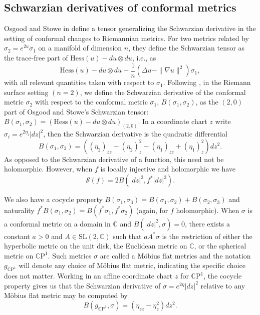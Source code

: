 \documentclass{amsart}
\newcommand{\C}{\mathbb{C}}
\newcommand{\CP}{\mathbb{C}\mathrm{P}}
\begin{document}
\subsection{Schwarzian derivatives of conformal metrics}



Osgood and Stowe in \cite{osgood-stowe1992} define a tensor generalizing the Schwarzian derivative in the setting of conformal changes to Riemannian metrics. 
For two metrics related by $\sigma_2 = e^{2u} \sigma_1$ on a manifold of dimension $n$, they define the Schwarzian tensor as the trace-free part of $\mathrm{Hess}(u) - du \otimes du$, i.e., as
\[
\mathrm{Hess}(u) - du \otimes du - \frac{1}{n}\left( \Delta u - \| \nabla u \|^2\right)\sigma_1,
\]
with all relevant quantities taken with respect to $\sigma_1$. 
Following \cite{dumas2017}, in the Riemann surface setting $(n=2)$, we define the Schwarzian derivative of the conformal metric $\sigma_2$ with respect to the conformal metric $\sigma_1$, $B(\sigma_1,\sigma_2)$, as the $(2,0)$ part of Osgood and Stowe's Schwarzian tensor: $B(\sigma_1,\sigma_2) = \left(\mathrm{Hess}(u) - du \otimes du\right)_{(2,0)}$. 
In a coordinate chart $z$  write $\sigma_i = e^{2\eta_i} |dz|^2$, then the Schwarzian derivative is the quadratic differential 
 \[
 B(\sigma_1,\sigma_2) = \left( (\eta_2)_{zz} - (\eta_2)_z^2 - (\eta_1)_{zz} + (\eta_1)_z^2 \right) dz^2.
 \]
As opposed to the Schwarzian derivative of a function, this need not be holomorphic. 
However, when $f$ is locally injective and holomorphic we have
 \[
 \mathcal{S}(f) = 2B(|dz|^2,f^*|dz|^2).
 \]
 
 
We also have a cocycle property $B(\sigma_1,\sigma_3) = B(\sigma_1,\sigma_2) + B(\sigma_2,\sigma_3)$ and naturality $f^*B(\sigma_1,\sigma_2) = B(f^*\sigma_1,f^*\sigma_2)$ (again, for $f$ holomorphic). 
When $\sigma$ is a conformal metric on a domain in $\C$ and $B(|dz|^2,\sigma) = 0$, there exists a constant $a > 0$ and $A \in \text{SL}(2,\C)$ such that $aA^*\sigma$ is the restriction of either the hyperbolic metric on the unit disk, the Euclidean metric on $\C$, or the spherical metric on $\CP^1$. 
Such metrics $\sigma$ are called a M\"obius flat metrics and the notation $g_{\CP^1}$ will denote any choice of M\"obius flat metric, indicating the specific choice does not matter. 
Working in an affine coordinate chart $z$ for $\CP^1$, the cocycle property gives us that the Schwarzian derivative of $\sigma = e^{2\eta}|dz|^2$ relative to any M\"obius flat metric may be computed by
 \[
 B(g_{\CP^1},\sigma) = (\eta_{zz} - \eta_{z}^2 )dz^2.
 \]
\end{document}
